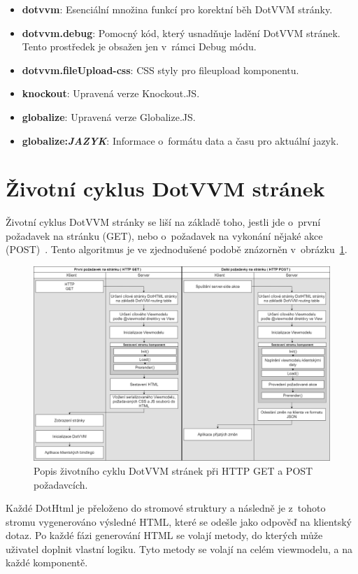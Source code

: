\begin{itemize}
  \setlength\itemsep{0.2em}
    \item \textbf{dotvvm}:
    Esenciální množina funkcí pro korektní běh DotVVM stránky.
    \item \textbf{dotvvm.debug}:
    Pomocný kód, který usnadňuje ladění DotVVM stránek. Tento prostředek je obsažen jen v~rámci Debug módu.
    \item \textbf{dotvvm.fileUpload-css}: 
    CSS styly pro fileupload komponentu.
    \item \textbf{knockout}: 
    Upravená verze Knockout.JS.
    \item \textbf{globalize}: 
    Upravená verze Globalize.JS.
    \item \textbf{globalize:\textit{JAZYK}}:
    Informace o~formátu data a času pro aktuální jazyk.
\end{itemize}
\section{Životní cyklus DotVVM stránek}
\label{lifecycle}
Životní cyklus DotVVM stránky se liší na základě toho, jestli jde o~první požadavek na stránku (GET), nebo o~požadavek na vykonání nějaké akce (POST)~\cite{DotVVM-VM}. Tento algoritmus je ve zjednodušené podobě znázorněn v~obrázku~\ref{Get a Post v DotVVM}.
\begin{figure}[!h]
	\centering
	\includegraphics[width=1\textwidth]{obrazky-figures/DotVVM_lifecycle.png}\hfill
	\caption{Popis životního cyklu DotVVM stránek při HTTP GET a POST požadavcích.}
	\label{Get a Post v DotVVM}
\end{figure}

Každé DotHtml je přeloženo do stromové struktury a následně je z~tohoto stromu vygenerováno výsledné HTML, které se odešle jako odpověď na klientský dotaz. Po každé fázi generování HTML se volají metody, do kterých může uživatel doplnit vlastní logiku. Tyto metody se volají na celém viewmodelu, a na každé komponentě.

